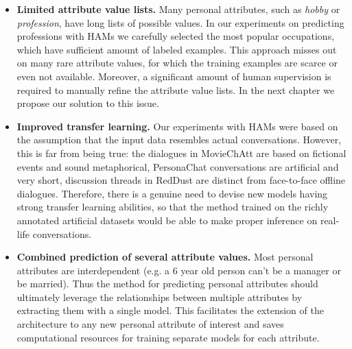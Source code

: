 \begin{itemize}
    \item \textbf{Limited attribute value lists.} Many personal attributes, such as \textit{hobby} or \textit{profession}, have long lists of possible values. In our experiments on predicting professions with HAMs we carefully selected the most popular occupations, which have sufficient amount of labeled examples. This approach misses out on many rare attribute values, for which the training examples are scarce or even not available. Moreover, a significant amount of human supervision is required to manually refine the attribute value lists. In the next chapter we propose our solution to this issue.
    
    \item \textbf{Improved transfer learning.} Our experiments with HAMs were based on the assumption that the input data resembles actual conversations. However, this is far from being true: the dialogues in MovieChAtt are based on fictional events and sound metaphorical, PersonaChat conversations are artificial and very short, discussion threads in RedDust are distinct from face-to-face offline dialogues. Therefore, there is a genuine need to devise new models having strong transfer learning abilities, so that the method trained on the richly annotated artificial datasets would be able to make proper inference on real-life conversations. %
    
    \item \textbf{Combined prediction of several attribute values.} Most personal attributes are interdependent (e.g. a 6 year old person can't be a manager or be married). Thus the method for predicting personal attributes should ultimately leverage the relationships between multiple attributes by extracting them with a single model. This facilitates the extension of the architecture to any new personal attribute of interest and saves computational resources for training separate models for each attribute.
    
\end{itemize}

